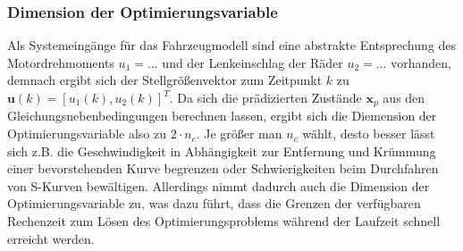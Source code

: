 \subsubsection{Dimension der Optimierungsvariable}
Als Systemeingänge für das Fahrzeugmodell sind eine abstrakte Entsprechung des Motordrehmoments $u_1=...$ und der Lenkeinschlag der Räder $u_2=...$ vorhanden, demnach ergibt sich der Stellgrößenvektor zum Zeitpunkt $k$ zu $\boldsymbol{u}(k)=[u_1(k), u_2(k)]^T$. Da sich die prädizierten Zustände $\boldsymbol{x}_p$ aus den Gleichungsnebenbedingungen berechnen lassen, ergibt sich die Diemension der Optimierungsvariable also zu $2\cdot n_c$.
Je größer man $n_c$ wählt, desto besser lässt sich z.B. die Geschwindigkeit in Abhängigkeit zur Entfernung und Krümmung einer bevorstehenden Kurve begrenzen oder Schwierigkeiten beim Durchfahren von S-Kurven bewältigen. Allerdings nimmt dadurch auch die Dimension der Optimierungsvariable zu, was dazu führt, dass die Grenzen der verfügbaren Rechenzeit zum Lösen des Optimierungsproblems während der Laufzeit schnell erreicht werden.
